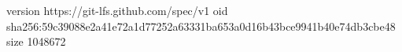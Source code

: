 version https://git-lfs.github.com/spec/v1
oid sha256:59c39088e2a41e72a1d77252a63331ba653a0d16b43bce9941b40e74db3cbe48
size 1048672
